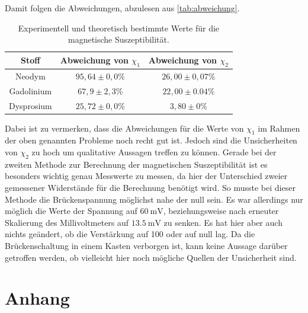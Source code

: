 Damit folgen die Abweichungen, abzulesen aus \autoref{tab:abweichung}.
\begin{table}[H]
    \centering
    \caption{Experimentell und theoretisch bestimmte Werte für die magnetische Suszeptibilität.}
    \label{tab:abweichung}
    \begin{tabular}{c| c c}
        \toprule
        Stoff & Abweichung von $\chi_1$ & Abweichung von $\chi_2$ \\
        \midrule
        Neodym &  $95,64 \pm 0,0 \%$ & $26,00 \pm 0,07 \%$ \\
        Gadolinium & $67,9 \pm 2,3 \%$ & $22,00 \pm 0.04 \%$ \\
        Dysprosium & $25,72 \pm 0,0\%$ & $3,80 \pm 0 \%$ \\
      \bottomrule
    \end{tabular}
\end{table}


\noindent
Dabei ist zu vermerken, dass die Abweichungen für die Werte von $\chi_1$ im Rahmen der oben genannten Probleme noch recht gut ist. Jedoch sind die Unsicherheiten von $\chi_2$ zu hoch um qualitative Aussagen treffen zu können.
Gerade bei der zweiten Methode zur Berechnung der magnetischen Suszeptibilität ist es besonders wichtig genau Messwerte zu messen, da hier der Unterschied zweier gemessener Widerstände für die Berechnung benötigt wird. So musste bei dieser Methode
die Brückenspannung möglichst nahe der null sein. Es war allerdings nur möglich die Werte der Spannung auf $\SI{60}{\milli\volt}$, beziehungsweise nach erneuter Skalierung des Millivoltmeters auf
$\SI{13,5}{\milli\volt}$ zu senken. Es hat hier aber auch nichts geändert, ob die Verstärkung auf 100 oder auf null lag.
Da die Brückenschaltung in einem Kasten verborgen ist, kann keine Aussage darüber getroffen werden, ob vielleicht hier noch mögliche Quellen der Unsicherheit sind.


\section{Anhang}
\label{sec:Anhang}

